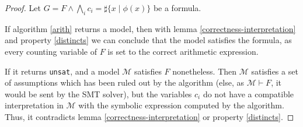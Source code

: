\documentclass[]{article}
\begin{document}
\begin{proof}
Let $G = F \land \bigwedge\limits_{i} c_i = \sharp\{x\mid\phi(x)\}$ be a formula.

If algorithm \ref{arith} returns a model, then with lemma \ref{correctness-interpretation} and property
\ref{distincts} we can conclude that the model satisfies the formula, as every counting variable of
$F$ is set to the correct arithmetic expression.

If it returns \texttt{unsat}, and a model $\mathcal{M}$ satisfies $F$ nonetheless. Then $\mathcal{M}$
satisfies a set of assumptions which has been ruled out by the algorithm (else, as $\mathcal{M}
\vdash F$, it would be sent by the SMT solver), but the variables $c_i$ do not have a compatible
interpretation in $\mathcal{M}$ with the symbolic expression computed by the algorithm. Thus, it
contradicts lemma \ref{correctness-interpretation} or property \ref{distincts}.
\end{proof}









%
\end{document}
